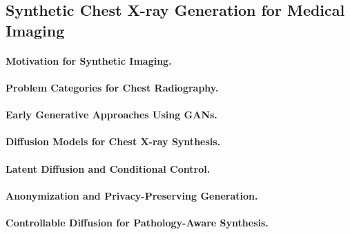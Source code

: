 \subsection{Synthetic Chest X-ray Generation for Medical Imaging}

\paragraph{Motivation for Synthetic Imaging.}

\paragraph{Problem Categories for Chest Radiography.}

\paragraph{Early Generative Approaches Using GANs.}

\paragraph{Diffusion Models for Chest X-ray Synthesis.}

\paragraph{Latent Diffusion and Conditional Control.}

\paragraph{Anonymization and Privacy-Preserving Generation.}

\paragraph{Controllable Diffusion for Pathology-Aware Synthesis.}
